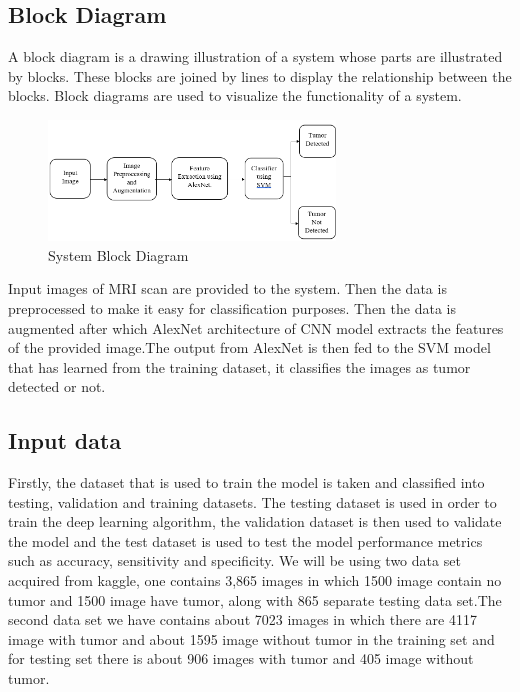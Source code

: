   \subsection{Block Diagram}
  \vspace{-18pt}
A block diagram is a drawing illustration of a system whose parts are illustrated by blocks. These blocks are joined by lines to display the relationship between the blocks. Block diagrams are used to visualize the functionality of a system.
\begin{figure}[tbh] %
\begin{center}
	\includegraphics[width=3in]{images/systemBlock.png} 
	\caption{ System Block Diagram} %
	\label{System Block Diagram} %
	
\end{center}
\end{figure}
\par
Input images of MRI scan are provided to the system. Then the data is preprocessed to make it easy for classification purposes. Then the data is augmented after which AlexNet architecture of CNN model extracts the features of the provided image.The output from AlexNet is then fed to the SVM model that has learned from the training dataset, it classifies the images as tumor detected or not.
\subsection{Input data}
\vspace{-18pt}
Firstly, the dataset that is used to train the model is taken and classified into testing, validation and training datasets. The testing dataset is used in order to train the deep learning algorithm, the validation dataset is then used to validate the model and the test dataset is used to test the model performance metrics such as accuracy, sensitivity and specificity. We will be using two data set acquired from kaggle, one contains 3,865 images in which 1500 image contain no tumor and 1500 image have tumor, along with 865 separate testing data set.The second data set we have contains about 7023 images in which there are 4117 image with tumor and about 1595 image without tumor in the training set and for testing set there  is about 906 images with tumor and 405 image without tumor. 
